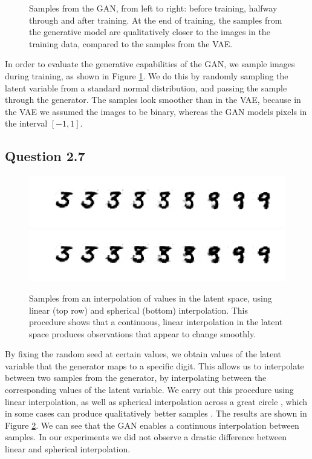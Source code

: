 \documentclass{article}
\begin{document}
\begin{figure}[t]
\begin{subfigure}{0.32\textwidth}
\end{subfigure}
 \caption{Samples from the GAN, from left to right: before training, halfway through and after training. At the end of training, the samples from the generative model are qualitatively closer to the images in the training data, compared to the samples from the VAE.}
\label{fig:gan_samples}
\end{figure}

In order to evaluate the generative capabilities of the GAN, we sample images during training, as shown in Figure \ref{fig:gan_samples}. We do this by randomly sampling the latent variable from a standard normal distribution, and passing the sample through the generator. The samples look smoother than in the VAE, because in the VAE we assumed the images to be binary, whereas the GAN models pixels in the interval $[-1, 1]$.

\subsection*{Question 2.7}

\begin{figure}[t]
\centering
\includegraphics[scale=0.7]{img/gan_lerp}\\
\includegraphics[scale=0.7]{img/gan_slerp}
\caption{Samples from an interpolation of values in the latent space, using linear (top row) and spherical (bottom) interpolation. This procedure shows that a continuous, linear interpolation in the latent space produces observations that appear to change smoothly.}
\label{fig:gan_interp}
\end{figure}

By fixing the random seed at certain values, we obtain values of the latent variable that the generator maps to a specific digit. This allows us to interpolate between two samples from the generator, by interpolating between the corresponding values of the latent variable. We carry out this procedure using linear interpolation, as well as spherical interpolation across a great circle \cite{shoemake1985animating}, which in some cases can produce qualitatively better samples \cite{white2016sampling}. The results are shown in Figure \ref{fig:gan_interp}. We can see that the GAN enables a continuous interpolation between samples. In our experiments we did not observe a drastic difference between linear and spherical interpolation.
\end{document}
